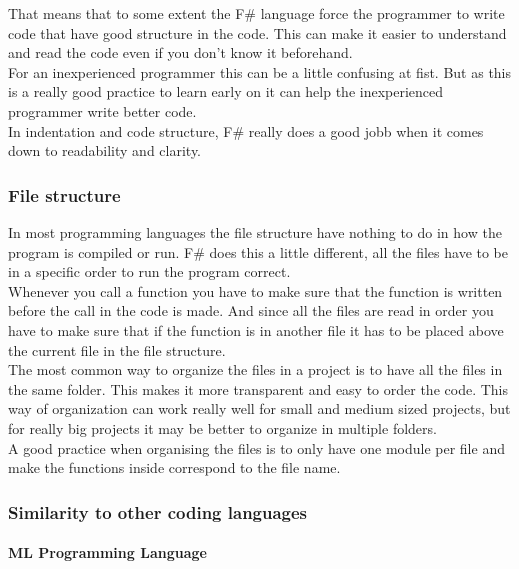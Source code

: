 \documentclass[12pt, a4paper]{article}
\begin{document}
That means that to some extent the F\# language force the programmer to write code that have good structure in the code. This can make it easier to understand and read the code even if you don't know it beforehand.\\

For an inexperienced programmer this can be a little confusing at fist. But as this is a really good practice to learn early on it can help the inexperienced programmer write better code.\\

In indentation and code structure, F\# really does a good jobb when it comes down to readability and clarity.

\newpage
\subsubsection{File structure}

In most programming languages the file structure have nothing to do in how the program is compiled or run. F\# does this a little different, all the files have to be in a specific order to run the program correct.\\

Whenever you call a function you have to make sure that the function is written before the call in the code is made. And since all the files are read in order you have to make sure that if the function is in another file it has to be placed above the current file in the file structure.\\

The most common way to organize the files in a project is to have all the files in the same folder. This makes it more transparent and easy to order the code. This way of organization can work really well for small and medium sized projects, but for really big projects it may be better to organize in multiple folders.\\

A good practice when organising the files is to only have one module per file and make the functions inside correspond to the file name.\\

\newpage
\subsubsection{Similarity to other coding languages}

\paragraph{ML Programming Language}
\end{document}

